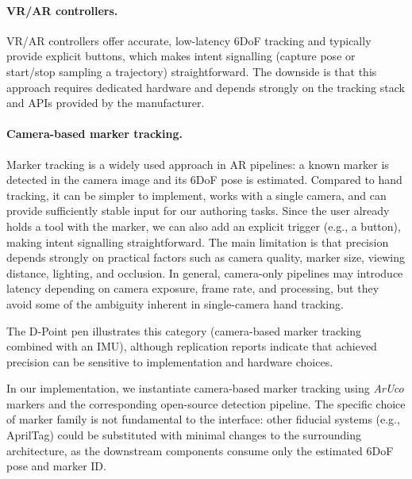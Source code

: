\paragraph{VR/AR controllers.} 
VR/AR controllers offer accurate, low-latency 6DoF tracking and typically provide explicit buttons, which makes intent signalling (capture pose or start/stop sampling a trajectory) straightforward. The downside is that this approach requires dedicated hardware and depends strongly on the tracking stack and APIs provided by the manufacturer.

\paragraph{Camera-based marker tracking.}
Marker tracking is a widely used approach in AR pipelines: a known marker is detected in the camera image and its 6DoF pose is estimated. Compared to hand tracking, it can be simpler to implement, works with a single camera, and can provide sufficiently stable input for our authoring tasks. Since the user already holds a tool with the marker, we can also add an explicit trigger (e.g., a button), making intent signalling straightforward. The main limitation is that precision depends strongly on practical factors such as camera quality, marker size, viewing distance, lighting, and occlusion. In general, camera-only pipelines may introduce latency depending on camera exposure, frame rate, and processing, but they avoid some of the ambiguity inherent in single-camera hand tracking.

The D-Point pen \cite{dpoint_github} illustrates this category (camera-based marker tracking combined with an IMU), although replication reports \cite{dpoint_issues} indicate that achieved precision can be sensitive to implementation and hardware choices.

In our implementation, we instantiate camera-based marker tracking using \emph{ArUco} markers and the corresponding open-source detection pipeline. The specific choice of marker family is not fundamental to the interface: other fiducial systems (e.g., AprilTag) could be substituted with minimal changes to the surrounding architecture, as the downstream components consume only the estimated 6DoF pose and marker ID.

